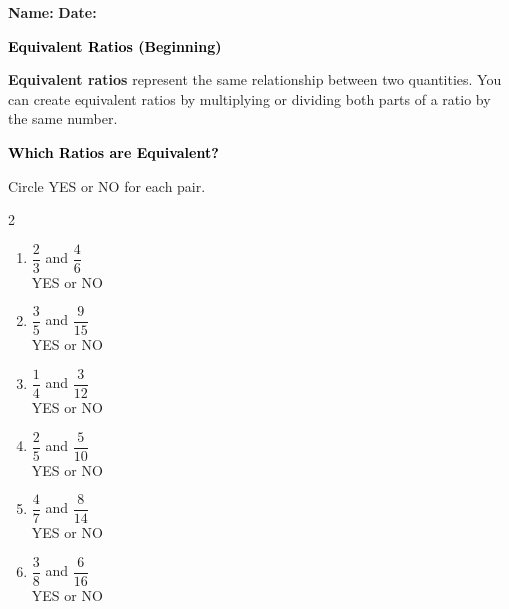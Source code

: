 \documentclass[12pt, letterpaper, fleqn]{article}
\begin{document}
\textbf{Name:} \underline{\hspace{5cm}}
\hfill
\textbf{Date:} \underline{\hspace{3cm}}\\

\begin{tcolorbox}[colback=customteal!20]
    \large\textcolor{black}{\textbf{Equivalent Ratios (Beginning)}}
\end{tcolorbox}

\vspace{3mm}

\noindent
\textbf{Equivalent ratios} represent the same relationship between two quantities. You can create equivalent ratios by multiplying or dividing both parts of a ratio by the same number.

\vspace{4mm}

\begin{tcolorbox}[colback=customteal!20]
\large\textcolor{black}{\textbf{Which Ratios are Equivalent?}}
\end{tcolorbox}

\noindent
Circle YES or NO for each pair.

\vspace{3mm}

\begin{multicols}{2}
\begin{enumerate}[itemsep=1.2cm, leftmargin=0.6cm]

\item $\dfrac{2}{3}$ and $\dfrac{4}{6}$\\
YES \quad or \quad NO

\item $\dfrac{3}{5}$ and $\dfrac{9}{15}$\\
YES \quad or \quad NO

\item $\dfrac{1}{4}$ and $\dfrac{3}{12}$\\
YES \quad or \quad NO

\item $\dfrac{2}{5}$ and $\dfrac{5}{10}$\\
YES \quad or \quad NO

\item $\dfrac{4}{7}$ and $\dfrac{8}{14}$\\
YES \quad or \quad NO

\item $\dfrac{3}{8}$ and $\dfrac{6}{16}$\\
YES \quad or \quad NO

\end{enumerate}
\end{multicols}
\end{document}
